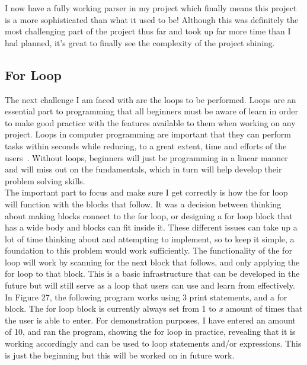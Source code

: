 \documentclass[a4paper, 12pt]{article}
\begin{document}
            I now have a fully working parser in my project which finally means this project
            is a more sophisticated than what it used to be! Although this was definitely
            the most challenging part of the project thus far and took up far more time than I
            had planned, it's great to finally see the complexity of the project shining.


        \clearpage
        \subsection{For Loop}
            The next challenge I am faced with are the loops to be performed. Loops are an essential
            part to programming that all beginners must be aware of learn in order to make good
            practice with the features available to them when working on any project. Loops in
            computer programming are important that they can perform tasks within seconds while
            reducing, to a great extent, time and efforts of the users~\cite{loops}. Without loops,
            beginners will just be programming in a linear manner and will miss out on the fundamentals,
            which in turn will help develop their problem solving skills. \\

            The important part to focus and make sure I get correctly is how the for loop will
            function with the blocks that follow. It was a decision between thinking about making
            blocks connect to the for loop, or designing a for loop block that has a wide body and
            blocks can fit inside it. These different issues can take up a lot of time thinking
            about and attempting to implement, so to keep it simple, a foundation to this problem
            would work sufficiently. The functionality of the for loop will work by scanning for
            the next block that follows, and only applying the for loop to that block. This is
            a basic infrastructure that can be developed in the future but will still serve as
            a loop that users can use and learn from effectively. \\

            In Figure 27, the following program works using 3 print statements, and a for block.
            The for loop block is currently always set from 1 to \textit{x} amount of times that
            the user is able to enter. For demonstration purposes, I have entered an amount of 10,
            and ran the program, showing the for loop in practice, revealing that it is working
            accordingly and can be used to loop statements and/or expressions. This is just the
            beginning but this will be worked on in future work.
\end{document}
